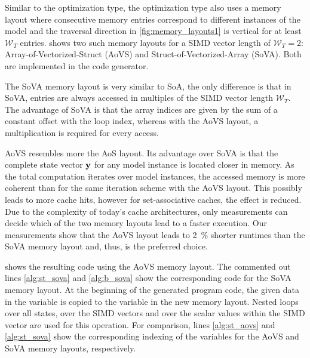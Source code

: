 Similar to the  optimization type, the  optimization type also uses a memory layout where consecutive memory entries correspond to different instances of the model and the traversal direction in \cref{fig:memory_layouts1} is vertical for at least $\mathcal{W}_T$ entries.  shows two such memory layouts for a SIMD vector length of $\mathcal{W}_T=2$: Array-of-Vectorized-Struct (AoVS) and Struct-of-Vectorized-Array (SoVA). Both are implemented in the code generator. 

The SoVA memory layout is very similar to SoA, the only difference is that in SoVA, entries are always accessed in multiples of the SIMD vector length $\mathcal{W}_T$. The advantage of SoVA is that the array indices are given by the sum of a constant offset with the loop index, whereas with the AoVS layout, a multiplication is required for every access.

AoVS resembles more the AoS layout. Its advantage over SoVA is that the complete state vector $\textbf{y}$ for any model instance is located closer in memory. As the total computation iterates over model instances, the accessed memory is more coherent than for the same iteration scheme with the AoVS layout. This possibly leads to more cache hits, however for set-associative caches, the effect is reduced. Due to the complexity of today's cache architectures, only measurements can decide which of the two memory layouts lead to a faster execution. Our measurements show that the AoVS layout leads to \SI{2}{\percent} shorter runtimes than the SoVA memory layout and, thus, is the preferred choice.

%
% 

 shows the resulting code using the AoVS memory layout. The commented out lines \ref{alg:st_sova} and \ref{alg:b_sova} show the corresponding code for the SoVA memory layout.
At the beginning of the generated program code, the given data in the  variable is copied to the  variable in the new memory layout. Nested loops over all states, over the SIMD vectors and over the scalar values within the SIMD vector are used for this operation. For comparison, lines \ref{alg:st_aovs} and \ref{alg:st_sova} show the corresponding indexing of the  variables for the AoVS and SoVA memory layouts, respectively.

